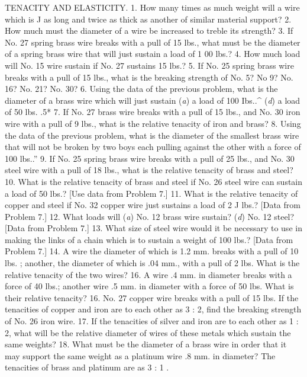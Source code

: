 TENACITY AND ELASTICITY.
1. How many times as much weight will a wire which is J as long and twice as thick as another of similar material support?
2. How much must the diameter of a wire be increased to treble its strength?
3. If No. 27 spring brass wire breaks with a pull of 15 lbs., what must be the diameter of a spring brass wire that will just sustain a load of 1 00 lbs.?
4. How much load will No. 15 wire sustain if No. 27 sustains 15 lbs.?
5. If No. 25 spring brass wire breaks with a pull of 15 lbs., what is the breaking strength of No. 5? No 9? No. 16? No. 21? No. 30?
6. Using the data of the previous problem, what is the diameter of a brass wire which will just sustain (\emph{a}) a load of 100 Ibs..^ (\emph{d}) a load of 50 lbs. .5*
7. If No. 27 brass wire breaks with a pull of 15 lbs., and No. 30 iron wire with a pull of 9 lbs., what is the relative tenacity of iron and brass?
8. Using the data of the previous problem, what is the diameter of the smallest brass wire that will not be broken by two boys each pulling against the other with a force of 100 lbs..''
9. If No. 25 spring brass wire breaks with a pull of 25 lbs., and No. 30 steel wire with a pull of 18 lbs., what is the relative tenacity of brass and steel?
10. What is the relative tenacity of brass and steel if No. 26 steel wire can sustain a load of 50 lbs.? [Use data from Problem 7.]
11. What is the relative tenacity of copper and steel if No. 32 copper wire just sustains a load of 2 J lbs.? [Data from Problem 7.]
12. What loads will (\emph{a}) No. 12 brass wire sustain? (\emph{d}) No. 12 steel? [Data from Problem 7.]
13. What size of steel wire would it be necessary to use in making the links of a chain which is to sustain a weight of 100 lbs.? [Data from Problem 7.]
14. A wire the diameter of which is 1.2 mm. breaks with a pull of 10 lbs. ; another, the diameter of which is .04 mm., with a pull of 2 lbs. What is the relative tenacity of the two wires?
16. A wire .4 mm. in diameter breaks with a force of 40 lbs.; another wire .5 mm. in diameter with a force of 50 lbs. What is their relative tenacity?
16. No. 27 copper wire breaks with a pull of 15 lbs. If the tenacities of copper and iron are to each other as 3 : 2, find the breaking strength of No. 26 iron wire.
17. If the tenacities of silver and iron are to each other as 1 : 2, what will be the relative diameter of wires of these metals which sustain the same weights?
18. What must be the diameter of a brass wire in order that it may support the same weight as a platinum wire .8 mm. in diameter? The tenacities of brass and platinum are as 3 : 1 .
